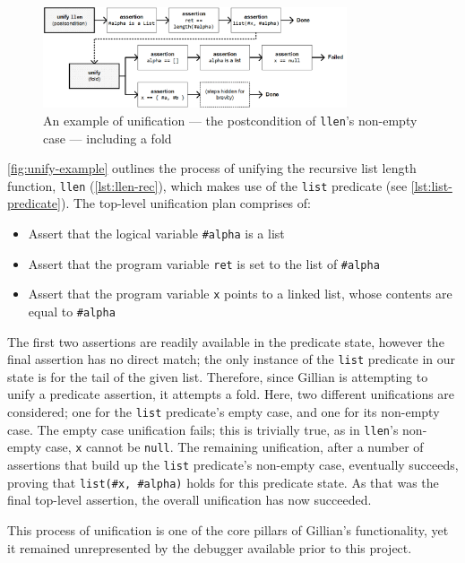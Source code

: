 \begin{figure}
  \center{}
  \includegraphics[width=0.8\textwidth]{img/unify-example.png}
  \caption{
    An example of unification --- the postcondition of \texttt{llen}'s non-empty
    case --- including a fold}\label{fig:unify-example}
\end{figure}

\autoref{fig:unify-example} outlines the process of unifying the recursive list
length function, \texttt{llen} (\autoref{lst:llen-rec}), which makes use of the
\texttt{list} predicate (see \autoref{lst:list-predicate}). The top-level
unification plan comprises of:
\begin{itemize}
  \item Assert that the logical variable \texttt{\#alpha} is a list
  \item Assert that the program variable \texttt{ret} is set to the list of
        \texttt{\#alpha}
  \item Assert that the program variable \texttt{x} points to a linked list,
        whose contents are equal to \texttt{\#alpha}
\end{itemize}
The first two assertions are readily available in the predicate state, however
the final assertion has no direct match; the only instance of the \texttt{list}
predicate in our state is for the tail of the given list. Therefore, since
Gillian is attempting to unify a predicate assertion, it attempts a fold.
Here, two different unifications are considered; one for the \texttt{list}
predicate's empty case, and one for its non-empty case. The empty case
unification fails; this is trivially true, as in \texttt{llen}'s non-empty case,
\texttt{x} cannot be \texttt{null}. The remaining unification, after a number of
assertions that build up the \texttt{list} predicate's non-empty case,
eventually succeeds, proving that \texttt{list(\#x, \#alpha)} holds for this
predicate state. As that was the final top-level assertion, the overall
unification has now succeeded.

This process of unification is one of the core pillars of Gillian's
functionality, yet it remained unrepresented by the debugger available prior to
this project.


